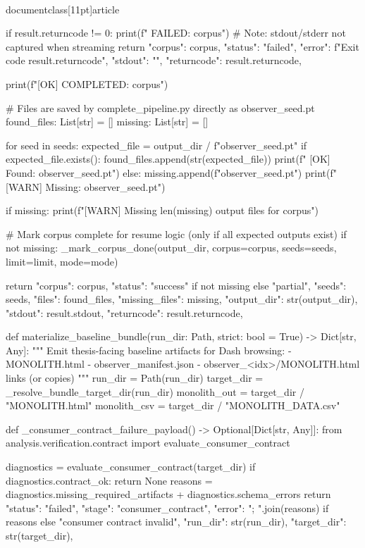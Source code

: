 \\documentclass[11pt]{article}
\begin{document}
\begin{CodeBlock}
    if result.returncode != 0:
        print(f" FAILED: {corpus}")
        # Note: stdout/stderr not captured when streaming
        return {
            "corpus": corpus,
            "status": "failed",
            "error": f"Exit code {result.returncode}",
            "stdout": "",
            "returncode": result.returncode,
        }

    print(f"[OK] COMPLETED: {corpus}")

    # Files are saved by complete_pipeline.py directly as observer_{seed}.pt
    found_files: List[str] = []
    missing: List[str] = []

    for seed in seeds:
        expected_file = output_dir / f"observer_{seed}.pt"
        if expected_file.exists():
            found_files.append(str(expected_file))
            print(f"  [OK] Found: observer_{seed}.pt")
        else:
            missing.append(f"observer_{seed}.pt")
            print(f"  [WARN] Missing: observer_{seed}.pt")

    if missing:
        print(f"[WARN] Missing {len(missing)} output files for {corpus}")

    # Mark corpus complete for resume logic (only if all expected outputs exist)
    if not missing:
        _mark_corpus_done(output_dir, corpus=corpus, seeds=seeds, limit=limit, mode=mode)

    return {
        "corpus": corpus,
        "status": "success" if not missing else "partial",
        "seeds": seeds,
        "files": found_files,
        "missing_files": missing,
        "output_dir": str(output_dir),
        "stdout": result.stdout,
        "returncode": result.returncode,
    }


def materialize_baseline_bundle(run_dir: Path, strict: bool = True) -> Dict[str, Any]:
    """
    Emit thesis-facing baseline artifacts for Dash browsing:
      - MONOLITH.html
      - observer_manifest.json
      - observer_<idx>/MONOLITH.html links (or copies)
    """
    run_dir = Path(run_dir)
    target_dir = _resolve_bundle_target_dir(run_dir)
    monolith_out = target_dir / "MONOLITH.html"
    monolith_csv = target_dir / "MONOLITH_DATA.csv"

    def _consumer_contract_failure_payload() -> Optional[Dict[str, Any]]:
        from analysis.verification.contract import evaluate_consumer_contract

        diagnostics = evaluate_consumer_contract(target_dir)
        if diagnostics.contract_ok:
            return None
        reasons = diagnostics.missing_required_artifacts + diagnostics.schema_errors
        return {
            "status": "failed",
            "stage": "consumer_contract",
            "error": "; ".join(reasons) if reasons else "consumer contract invalid",
            "run_dir": str(run_dir),
            "target_dir": str(target_dir),
        }


\end{CodeBlock}
\end{document}
